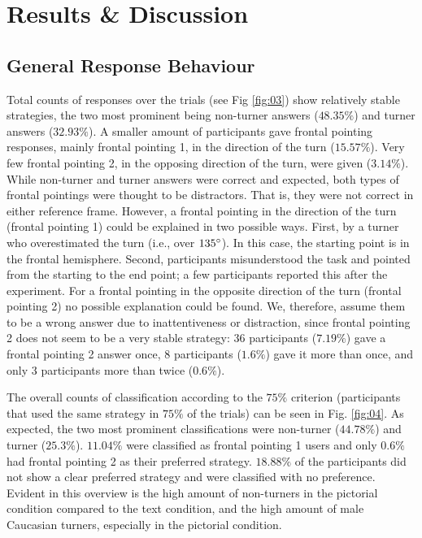 \documentclass{frontiersSCNS} %
\begin{document}



\section{Results \& Discussion}

\subsection{General Response Behaviour}


Total counts of responses over the trials (see Fig \ref{fig:03}) show relatively stable strategies, the two most prominent being non-turner answers ($48.35\%$) and turner answers ($32.93\%$). A smaller amount of participants gave frontal pointing responses, mainly frontal pointing 1, in the direction of the turn ($15.57\%$). Very few frontal pointing 2, in the opposing direction of the turn, were given ($3.14\%$). 
While non-turner and turner answers were correct and expected, both types of frontal pointings were thought to be distractors. That is, they were not correct in either reference frame. However, a frontal pointing in the direction of the turn (frontal pointing 1) could be explained in two possible ways. First, by a turner who overestimated the turn (i.e., over $135\degree$). In this case, the starting point is in the frontal hemisphere. Second, participants misunderstood the task and pointed from the starting to the end point; a few participants reported this after the experiment. 
For a frontal pointing in the opposite direction of the turn (frontal pointing 2) no possible explanation could be found. We, therefore, assume them to be a wrong answer due to inattentiveness or distraction, since frontal pointing 2 does not seem to be a very stable strategy: 36 participants ($7.19\%$) gave a frontal pointing 2 answer once, 8 participants ($1.6\%$) gave it more than once, and only 3 participants more than twice ($0.6\%$).

The overall counts of classification according to the $75\%$ criterion (participants that used the same strategy in $75\%$ of the trials) can be seen in Fig. \ref{fig:04}. As expected, the two most prominent classifications were non-turner ($44.78\%$) and turner ($25.3\%$). $11.04\%$ were classified as frontal pointing 1 users and only $0.6\%$ had frontal pointing 2 as their preferred strategy. $18.88\%$ of the participants did not show a clear preferred strategy and were classified with no preference.
Evident in this overview is the high amount of non-turners in the pictorial condition compared to the text condition, and the high amount of male Caucasian turners, especially in the pictorial condition.
\end{document}
